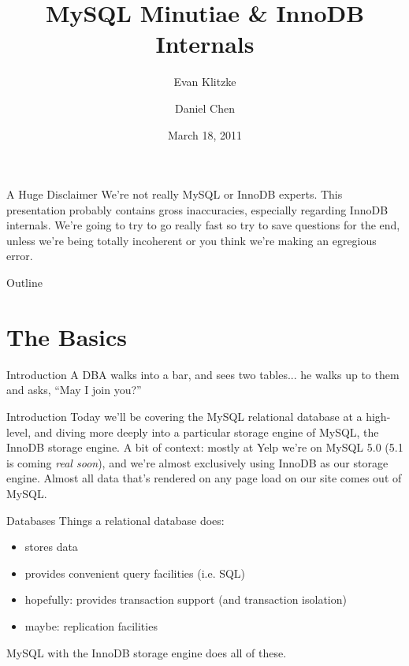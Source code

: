 \documentclass[14pt]{beamer}
\title{MySQL Minutiae \& InnoDB Internals}
\author{Evan Klitzke \and Daniel Chen}
\institute{Yelp, Inc.}
\date{March 18, 2011}
\begin{document}
\begin{frame}
  \titlepage
\end{frame}

\begin{frame}{A Huge Disclaimer}
  We're not really MySQL or InnoDB experts.
  \newline
  \newline
  This presentation probably contains gross inaccuracies, especially regarding
  InnoDB internals.
  \newline
  \newline
  We're going to try to go really fast so try to save questions for the end,
  unless we're being totally incoherent or you think we're making an egregious
  error.
\end {frame}

\begin{frame}{Outline}
  \tableofcontents
\end{frame}

\section{The Basics}

\begin{frame}{Introduction}
  A DBA walks into a bar, and sees two tables...
  \pause
  \newline
  he walks up to them and asks, ``May I join you?''
\end {frame}

\begin{frame}{Introduction}
  Today we'll be covering the MySQL relational database at a high-level, and
  diving more deeply into a particular storage engine of MySQL, the InnoDB
  storage engine.
  \newline
  \newline
  A bit of context: mostly at Yelp we're on MySQL 5.0 (5.1 is coming \emph{real
    soon}), and we're almost exclusively using InnoDB as our storage
  engine. Almost all data that's rendered on any page load on our site comes out
  of MySQL.
\end {frame}

\begin{frame}{Databases}
  Things a relational database does:
  \begin{itemize}
    \item stores data
    \item provides convenient query facilities (i.e. SQL)
    \item hopefully: provides transaction support (and transaction isolation)
    \item maybe: replication facilities
  \end{itemize}
  MySQL with the InnoDB storage engine does all of these.
\end{frame}
\end{document}
